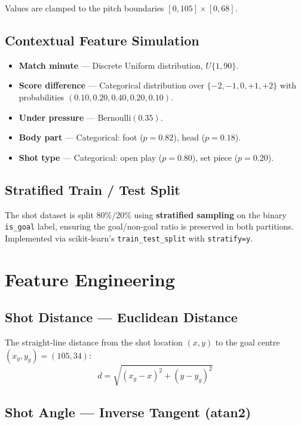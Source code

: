 \documentclass[11pt,a4paper]{article}
\begin{document}
Values are clamped to the pitch boundaries $[0, 105] \times [0, 68]$.

\subsection{Contextual Feature Simulation}

\begin{itemize}[nosep]
  \item \textbf{Match minute} --- Discrete Uniform distribution,
        $U\{1, 90\}$.
  \item \textbf{Score difference} --- Categorical distribution over
        $\{-2, -1, 0, +1, +2\}$ with probabilities
        $(0.10, 0.20, 0.40, 0.20, 0.10)$.
  \item \textbf{Under pressure} --- Bernoulli$(0.35)$.
  \item \textbf{Body part} --- Categorical: foot ($p=0.82$),
        head ($p=0.18$).
  \item \textbf{Shot type} --- Categorical: open play ($p=0.80$),
        set piece ($p=0.20$).
\end{itemize}

\subsection{Stratified Train / Test Split}

The shot dataset is split 80\%/20\% using \textbf{stratified sampling} on
the binary \texttt{is\_goal} label, ensuring the goal/non-goal ratio is
preserved in both partitions.  Implemented via scikit-learn's
\texttt{train\_test\_split} with \texttt{stratify=y}.


\section{Feature Engineering}

\subsection{Shot Distance --- Euclidean Distance}

The straight-line distance from the shot location $(x, y)$ to the goal
centre $(x_g, y_g) = (105, 34)$:
\[
  d = \sqrt{(x_g - x)^2 + (y - y_g)^2}
\]

\subsection{Shot Angle --- Inverse Tangent (atan2)}
\end{document}
